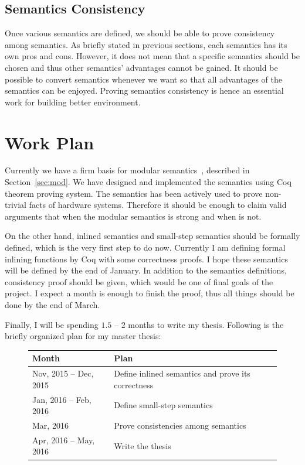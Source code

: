 \subsection{Semantics Consistency}

Once various semantics are defined, we should be able to prove
consistency among semantics. As briefly stated in previous sections,
each semantics has its own pros and cons. However, it does not mean
that a specific semantics should be chosen and thus other semantics'
advantages cannot be gained. It should be possible to convert
semantics whenever we want so that all advantages of the semantics can
be enjoyed. Proving semantics consistency is hence an essential work
for building better environment.

\section{Work Plan}

Currently we have a firm basis for modular semantics~\cite{CAV},
described in Section~\ref{sec:mod}. We have designed and implemented
the semantics using Coq theorem proving system. The semantics has been
actively used to prove non-trivial facts of hardware
systems. Therefore it should be enough to claim valid arguments that
when the modular semantics is strong and when is not.

On the other hand, inlined semantics and small-step semantics should
be formally defined, which is the very first step to do now. Currently
I am defining formal inlining functions by Coq with some correctness
proofs. I hope these semantics will be defined by the end of
January. In addition to the semantics definitions, consistency proof
should be given, which would be one of final goals of the project. I
expect a month is enough to finish the proof, thus all things should
be done by the end of March.

Finally, I will be spending $1.5$ -- $2$ months to write my thesis.
Following is the briefly organized plan for my master thesis:

\begin{figure}[h]
  \begin{center}
    \begin{tabular}{l|l}
      \hline
      Month & Plan \\
      \hline
      Nov, 2015 -- Dec, 2015 & Define inlined semantics and prove its correctness \\
      Jan, 2016 -- Feb, 2016 & Define small-step semantics \\
      Mar, 2016 & Prove consistencies among semantics \\
      Apr, 2016 -- May, 2016 & Write the thesis \\
      \hline
    \end{tabular}
  \end{center}
\end{figure}
